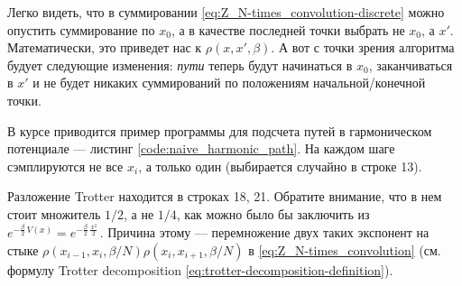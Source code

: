 \begin{lecture}
Легко видеть, что в суммировании \eqref{eq:Z_N-times_convolution-discrete} можно опустить суммирование по $x_0$, а в качестве последней точки выбрать не $x_0$, а $x'$.
Математически, это приведет нас к $\rho (x, x', \beta)$.
А вот с точки зрения алгоритма будует следующие изменения: \textit{пути} теперь будут начинаться в $x_0$, заканчиваться в $x'$ и не будет никаких суммирований по положениям начальной/конечной точки.

В курсе приводится пример программы для подсчета путей в гармоническом потенциале --- листинг \ref{code:naive_harmonic_path}.
На каждом шаге сэмплируются не все $x_i$, а только один (выбирается случайно в строке 13).

Разложение Trotter находится в строках 18, 21.
Обратите внимание, что в нем стоит множитель $1 /2$, а не $1 /4$, как можно было бы заключить из $e^{-\frac{\beta}{2}\, V(x)} = e^{-\frac{\beta}{2}\, \frac{x^2}{2}\,}$.
Причина этому --- перемножение двух таких экспонент на стыке $\rho (x_{i-1}, x_i, \beta /N) \rho (x_i, x_{i+1} , \beta /N)$ в \eqref{eq:Z_N-times_convolution} (см. формулу Trotter decomposition \eqref{eq:trotter-decomposition-definition}).

\end{lecture}
